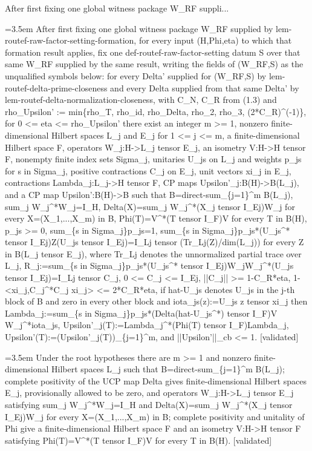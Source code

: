 \documentclass{article}
\newcommand{\step}[1]{\par\noindent\hangindent=3.5em\hangafter=1%
  \makebox[3.5em][l]{\textbf{#1.}}}
\newcommand{\steptag}[1]{\hfill{\small\textsf{[#1]}}}
\begin{document}
\begin{proofbox}{After first fixing one global witness package W\_RF suppli...}
\step{1} After first fixing one global witness package W\_RF supplied by lem-routef-raw-factor-setting-formation, for every input (H,Phi,eta) to which that formation result applies, fix one def-routef-raw-factor-setting datum S over that same W\_RF supplied by the same result, writing the fields of (W\_RF,S) as the unqualified symbols below: for every Delta' supplied for (W\_RF,S) by lem-routef-delta-prime-closeness and every Delta supplied from that same Delta' by lem-routef-delta-normalization-closeness, with C\_N, C\_R from (1.3) and rho\_Upsilon' := min\{rho\_T, rho\_id, rho\_Delta, rho\_2, rho\_3, (2*C\_R)\textasciicircum{}(-1)\}, for 0 <= eta <= rho\_Upsilon' there exist an integer m >= 1, nonzero finite-dimensional Hilbert spaces L\_j and E\_j for 1 <= j <= m, a finite-dimensional Hilbert space F, operators W\_j:H->L\_j tensor E\_j, an isometry V:H->H tensor F, nonempty finite index sets Sigma\_j, unitaries U\_js on L\_j and weights p\_js for s in Sigma\_j, positive contractions C\_j on E\_j, unit vectors xi\_j in E\_j, contractions Lambda\_j:L\_j->H tensor F, CP maps Upsilon'\_j:B(H)->B(L\_j), and a CP map Upsilon':B(H)->B such that B=direct-sum\_\{j=1\}\textasciicircum{}m B(L\_j), sum\_j W\_j\textasciicircum{}*W\_j=I\_H, Delta(X)=sum\_j W\_j\textasciicircum{}*(X\_j tensor I\_Ej)W\_j for every X=(X\_1,...,X\_m) in B, Phi(T)=V\textasciicircum{}*(T tensor I\_F)V for every T in B(H), p\_js >= 0, sum\_\{s in Sigma\_j\}p\_js=1, sum\_\{s in Sigma\_j\}p\_js*(U\_js\textasciicircum{}* tensor I\_Ej)Z(U\_js tensor I\_Ej)=I\_Lj tensor (Tr\_Lj(Z)/dim(L\_j)) for every Z in B(L\_j tensor E\_j), where Tr\_Lj denotes the unnormalized partial trace over L\_j, R\_j:=sum\_\{s in Sigma\_j\}p\_js*(U\_js\textasciicircum{}* tensor I\_Ej)W\_jW\_j\textasciicircum{}*(U\_js tensor I\_Ej)=I\_Lj tensor C\_j, 0 <= C\_j <= I\_Ej, ||C\_j|| >= 1-C\_R*eta, 1-<xi\_j,C\_j\textasciicircum{}*C\_j xi\_j> <= 2*C\_R*eta, if hat-U\_js denotes U\_js in the j-th block of B and zero in every other block and iota\_js(z):=U\_js z tensor xi\_j then Lambda\_j:=sum\_\{s in Sigma\_j\}p\_js*(Delta(hat-U\_js\textasciicircum{}*) tensor I\_F)V W\_j\textasciicircum{}*iota\_js, Upsilon'\_j(T):=Lambda\_j\textasciicircum{}*(Phi(T) tensor I\_F)Lambda\_j, Upsilon'(T):=(Upsilon'\_j(T))\_\{j=1\}\textasciicircum{}m, and ||Upsilon'||\_cb <= 1. \steptag{validated} \\[6pt]
\step{1.1} Under the root hypotheses there are m >= 1 and nonzero finite-dimensional Hilbert spaces L\_j such that B=direct-sum\_\{j=1\}\textasciicircum{}m B(L\_j); complete positivity of the UCP map Delta gives finite-dimensional Hilbert spaces E\_j, provisionally allowed to be zero, and operators W\_j:H->L\_j tensor E\_j satisfying sum\_j W\_j\textasciicircum{}*W\_j=I\_H and Delta(X)=sum\_j W\_j\textasciicircum{}*(X\_j tensor I\_Ej)W\_j for every X=(X\_1,...,X\_m) in B; complete positivity and unitality of Phi give a finite-dimensional Hilbert space F and an isometry V:H->H tensor F satisfying Phi(T)=V\textasciicircum{}*(T tensor I\_F)V for every T in B(H). \steptag{validated} \\[6pt]

\end{proofbox}
\end{document}
